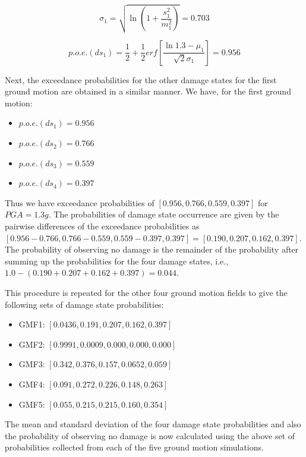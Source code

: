 \begin{equation}
	\sigma_1 = \sqrt{\ln \left( 1 + \frac{s_1^2}{m_1^2} \right)} = 0.703
\end{equation}

\begin{equation}
	p.o.e.(ds_1) = \frac{1}{2} + \frac{1}{2} erf \left[ \frac{\ln 1.3 - \mu_1}{\sqrt{2} \sigma_1} \right] = 0.956
\end{equation}

Next, the exceedance probabilities for the other damage states for the first ground motion are obtained in a similar manner. We have, for the first ground motion:

\begin{itemize}
	\item $p.o.e.(ds_1) = 0.956$
	\item $p.o.e.(ds_2) = 0.766$
	\item $p.o.e.(ds_3) = 0.559$
	\item $p.o.e.(ds_4) = 0.397$
\end{itemize}

Thus we have exceedance probabilities of $[0.956, 0.766, 0.559, 0.397]$ for $PGA = 1.3 g$. The probabilities of damage state occurrence are given by the pairwise differences of the exceedance probabilities as $[0.956 - 0.766, 0.766 - 0.559, 0.559 - 0.397, 0.397] = [0.190, 0.207, 0.162, 0.397]$. The probability of observing no damage is the remainder of the probability after summing up the probabilities for the four damage states, i.e., $1.0 - (0.190 + 0.207 + 0.162 + 0.397) = 0.044$.

This procedure is repeated for the other four ground motion fields to give the following sets of damage state probabilities:

\begin{itemize}
	\item GMF1: $[0.0436, 0.191, 0.207, 0.162, 0.397]$
	\item GMF2: $[0.9991, 0.0009, 0.000, 0.000, 0.000]$
	\item GMF3: $[0.342, 0.376, 0.157, 0.0652, 0.059]$
	\item GMF4: $[0.091, 0.272, 0.226, 0.148, 0.263]$
	\item GMF5: $[0.055, 0.215, 0.215, 0.160, 0.354]$
\end{itemize}

The mean and standard deviation of the four damage state probabilities and also the probability of observing no damage is now calculated using the above set of probabilities collected from each of the five ground motion simulations.